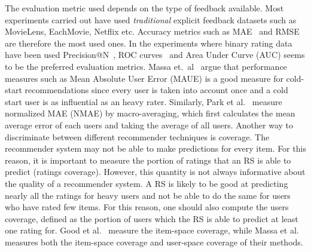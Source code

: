 The evaluation metric used depends on the type of feedback available.  Most
experiments carried out have used \emph{traditional} explicit feedback datasets
such as MovieLens, EachMovie, Netflix etc. Accuracy metrics such as
MAE~\cite{Rashid2002, Rashid2008, Massa2004, Massa2007, Stern2009} and
RMSE~\cite{Agarwal2009, Agarwal2010} are therefore the most used ones. In the
experiments where binary rating data have been used Precision@N~\cite{Liu2011,
Gantner2010}, ROC curves~\cite{Agarwal2009, Gantner2010, Schein2002} and Area
Under Curve (AUC) \cite{Liu2011, Gantner2010} seems to be the preferred
evaluation metrics.
Massa et.\ al~\cite{Massa2004} argue that performance measures such as Mean
Absolute User Error (MAUE) is a good measure for cold-start recommendations
since every user is taken into account once and a cold start user is as
influential as an heavy rater. Similarly, Park et al.~\cite{Park2006} measure
normalized MAE (NMAE) by macro-averaging, which first calculates the mean
average error of each users and taking the average of all users.
Another way to discriminate between different recommender techniques is
coverage. The recommender system may not be able to make predictions for every
item. For this reason, it is important to measure the portion of ratings that
an RS is able to predict (ratings coverage). However, this quantity is not
always informative about the quality of a recommender system. A RS is likely to
be good at predicting nearly all the ratings for heavy users and not be able to
do the same for users who have rated few items. For this reason, one should
also compute the users coverage, defined as the portion of users which the RS
is able to predict at least one rating for. Good et al.~\cite{Good1999}
measure the item-space coverage, while Massa et al.~\cite{Massa2004,
Massa2007} measures both the item-space coverage and user-space coverage of
their methods.

